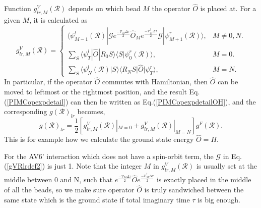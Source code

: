 \documentclass[12pt,letterpaper,UTF8]{report}
\begin{document}
Function $g^V_{lr,M}(\mathcal{R})$ depends on which bead $M$ the operator $\hat{O}$ is placed at.
For a given $M$, it is calculated as
\begin{equation}
g^V_{lr,M}(\mathcal{R}) =
\begin{cases}
\langle \psi^l_{M\!-\!1}  (\mathcal{R}) | \bm{\mathcal{G}}
   e^{\frac{- \mathcal{V}_M  \Delta \tau }{2}} \hat{O}_M   e^{\frac{- \mathcal{V}^\dagger_M  \Delta \tau }{2}} \bm{\mathcal{G}}
| \psi^r_{M\!+\!1} (\mathcal{R}) \rangle,
 &  M \neq 0, N . \\
\sum\limits_{S} \langle \psi^l_T| \hat{O} | R_0 S\rangle \langle S | \psi^r_0 (\mathcal{R}) \rangle,
 &  M=0. \\
\sum\limits_{S} \langle \psi^l_N (\mathcal{R}) | S \rangle \langle R_N S| \hat{O} | \psi^r_T \rangle,
 & M=N .
\end{cases}
\label{gVRlrdef2}
\end{equation}
In particular, if the operator $\hat{O}$ commutes with Hamiltonian, then $\hat{O}$ can be moved to leftmost or the rightmost position, and the result Eq.(\ref{PIMCopexpdetail}) can then be written as Eq.(\ref{PIMCopexpdetailOH}), and the corresponding $g(\mathcal{R})_{lr}$ becomes,
\begin{equation}
  g(\mathcal{R})_{lr} =  \frac{1}{2}
\left[ g^V_{lr,M}(\mathcal{R}) |_{M=0} + g^V_{lr,M}(\mathcal{R}) |_{M=N}  \right]
g^F(\mathcal{R}) .
\label{gRlrOH}
\end{equation}
This is for example how we calculate the ground state energy $\hat{O}=H$.

For the AV6' interaction which does not have a spin-orbit term, the $\bm{\mathcal{G}}$ in Eq.(\ref{gVRlrdef2}) is just 1.
Note that the integer $M$ in $g^V_{lr,M}(\mathcal{R})$ is usually set at the middle between 0 and N, such that $e^{\frac{- \mathcal{V}_M  \Delta \tau }{2}} \hat{O}  e^{\frac{- \mathcal{V}^\dagger_M  \Delta \tau }{2}} $ is exactly placed in the middle of all the beads, so we make sure operator $\hat{O}$ is truly sandwiched between the same state which is the ground state if total imaginary time $\tau$ is big enough.
\end{document}
